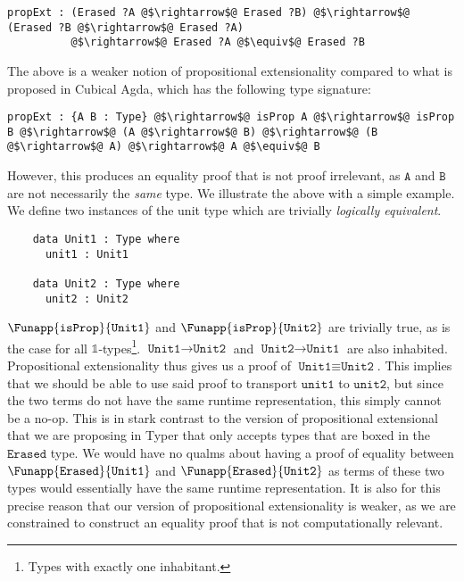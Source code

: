 \documentclass[12pt,twoside,maitrise]{dms}
\theoremstyle{definition}
\numberwithin{equation}{section}
\numberwithin{table}{chapter}
\numberwithin{figure}{chapter}
\newcommand\id[1] {\texttt{#1}}
\begin{document}
\begin{verbatim}
propExt : (Erased ?A @$\rightarrow$@ Erased ?B) @$\rightarrow$@ (Erased ?B @$\rightarrow$@ Erased ?A)
          @$\rightarrow$@ Erased ?A @$\equiv$@ Erased ?B
\end{verbatim}

The above is a weaker notion of propositional extensionality compared to what is
proposed in Cubical Agda, which has the following type signature:

\begin{verbatim}
propExt : {A B : Type} @$\rightarrow$@ isProp A @$\rightarrow$@ isProp B @$\rightarrow$@ (A @$\rightarrow$@ B) @$\rightarrow$@ (B @$\rightarrow$@ A) @$\rightarrow$@ A @$\equiv$@ B
\end{verbatim}

However, this produces an equality proof that is not proof irrelevant, as
$\id{A}$ and $\id{B}$ are not necessarily the \emph{same} type. We illustrate
the above with a simple example. We define two instances of the unit type which
are trivially \emph{logically equivalent}.

\begin{verbatim}
    data Unit1 : Type where
      unit1 : Unit1

    data Unit2 : Type where
      unit2 : Unit2
\end{verbatim}

$\Funapp{\id{isProp}}{\id{Unit1}}$ and $\Funapp{\id{isProp}}{\id{Unit2}}$ are
trivially true, as is the case for all $\mathbb{1}$-types\footnote{Types with
exactly one inhabitant.}. $\id{Unit1} \rightarrow \id{Unit2}$ and $\id{Unit2}
\rightarrow \id{Unit1}$ are also inhabited. Propositional extensionality thus
gives us a proof of $\id{Unit1} \equiv \id{Unit2}$. This implies that we should
be able to use said proof to transport $\id{unit1}$ to $\id{unit2}$, but since
the two terms do not have the same runtime representation, this simply cannot be
a no-op. This is in stark contrast to the version of propositional extensional
that we are proposing in Typer that only accepts types that are boxed in the
$\id{Erased}$ type. We would have no qualms about having a proof of equality
between $\Funapp{\id{Erased}}{\id{Unit1}}$ and
$\Funapp{\id{Erased}}{\id{Unit2}}$ as terms of these two types would essentially
have the same runtime representation. It is also for this precise reason that
our version of propositional extensionality is weaker, as we are constrained to
construct an equality proof that is not computationally relevant.
\end{document}
